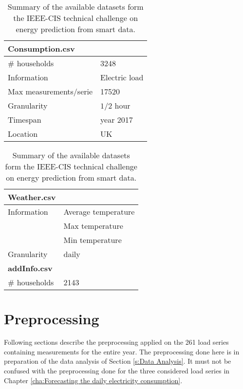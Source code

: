 \begin{table}
	\footnotesize
	\hspace{1cm}
	\begin{tabular}[h]{@{}ll}\hline
		\textbf{Consumption.csv}&\\ \hline
		\# households &3248 \\ 
		Information & Electric load\\
		Max measurements/serie & 17520\\
		Granularity&$ 1/2$ hour\\ 
		Timespan&year 2017 \\    
		Location&UK\\ \bottomrule   
	\end{tabular}
	\hspace{2cm}
	\begin{tabular}[t]{@{}ll}\hline
		\textbf{Weather.csv}&\\ \hline
		Information & Average temperature\\
		& Max temperature\\
		& Min temperature\\
		Granularity& daily\\ \hline \hline
		\textbf{addInfo.csv}&\\ \hline
		\# households &2143 \\ \bottomrule		    
	\end{tabular}
	\hfill
	\caption{Summary of the available datasets form the IEEE-CIS technical challenge on energy prediction from smart data.}
	\label{tab:available_data}
\end{table}


\section{Preprocessing}\label{s:Preprocessing}

Following sections describe the preprocessing applied on the 261 load series containing measurements for the entire year. The preprocessing done here is in preparation of the data analysis of Section \ref{s:Data Analysis}. It must not be confused with the preprocessing done for the three considered load series in Chapter \ref{cha:Forecasting the daily electricity consumption}.

